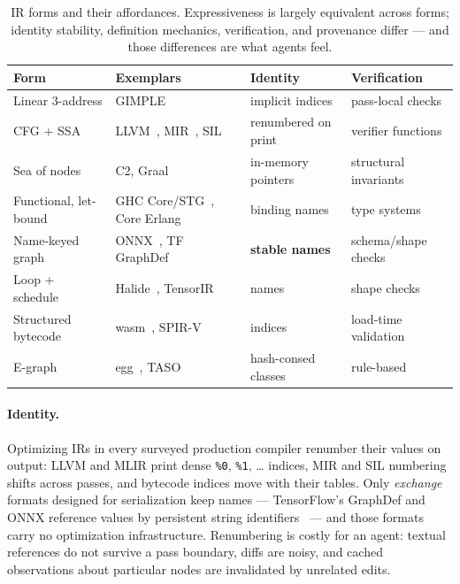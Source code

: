 \begin{table}[t]
  \centering
  \small
  \begin{tabularx}{\textwidth}{@{}>{\raggedright\arraybackslash}p{2.5cm} >{\raggedright\arraybackslash}p{3.3cm} >{\raggedright\arraybackslash}p{2.5cm} >{\raggedright\arraybackslash}X@{}}
  \toprule
  \textbf{Form} & \textbf{Exemplars} & \textbf{Identity} & \textbf{Verification} \\
  \midrule
  Linear 3-address & GIMPLE~\cite{merrill2003gimple} & implicit indices & pass-local checks \\
  CFG + SSA & LLVM~\cite{lattner2004llvm}, MIR~\cite{mir}, SIL~\cite{swiftsil} & renumbered on print & verifier functions \\
  Sea of nodes & C2, Graal~\cite{click1995sea, wurthinger2017graal} & in-memory pointers & structural invariants \\
  Functional, let-bound & GHC Core/STG~\cite{peytonjones1992stg}, Core Erlang~\cite{coreerlang} & binding names & type systems \\
  Name-keyed graph & ONNX~\cite{onnx}, TF GraphDef & \textbf{stable names} & schema/shape checks \\
  Loop + schedule & Halide~\cite{ragankelley2013halide}, TensorIR~\cite{zheng2023tensorir} & names & shape checks \\
  Structured bytecode & wasm~\cite{haas2017wasm}, SPIR-V~\cite{spirvspec} & indices & load-time validation \\
  E-graph & egg~\cite{willsey2021egg}, TASO~\cite{jia2019taso} & hash-consed classes & rule-based \\
  \bottomrule
  \end{tabularx}
  \caption{IR forms and their affordances. Expressiveness is largely equivalent across
  forms; identity stability, definition mechanics, verification, and provenance differ
  — and those differences are what agents feel.}
  \label{tab:forms}
\end{table}

\paragraph{Identity.} Optimizing IRs in every surveyed production compiler renumber
their values on output: LLVM and MLIR print dense \texttt{\%0}, \texttt{\%1}, \dots
indices, MIR and SIL numbering shifts across passes, and bytecode indices move with
their tables. Only \emph{exchange} formats designed for serialization keep names —
TensorFlow's GraphDef and ONNX reference values by persistent string
identifiers~\cite{onnx} — and those formats carry no optimization infrastructure.
Renumbering is costly for an agent: textual references do not survive a pass boundary,
diffs are noisy, and cached observations about particular nodes are invalidated by
unrelated edits.

